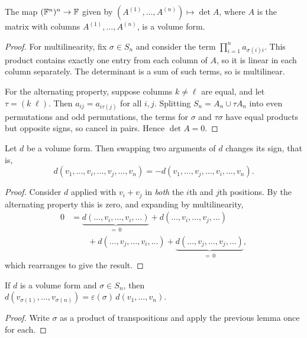 \documentclass[a4paper]{scrartcl}
\begin{document}
\begin{lemma}
    The map $(\mathbb{F}^n)^n \rightarrow \mathbb{F}$ given by $(A^{(1)}, \dots, A^{(n)}) \mapsto \det A$, where $A$ is the matrix with columns $A^{(1)}, \dots, A^{(n)}$, is a volume form.
\end{lemma}
\begin{proof}
    For multilinearity, fix $\sigma \in S_n$ and consider the term $\prod_{i = 1}^n a_{\sigma(i)i}$. This product contains exactly one entry from each column of $A$, so it is linear in each column separately. The determinant is a sum of such terms, so is multilinear.

    For the alternating property, suppose columns $k \neq \ell$ are equal, and let $\tau = (k\;\ell)$. Then $a_{i j} = a_{i \tau(j)}$ for all $i, j$. Splitting $S_n = A_n \cup \tau A_n$ into even permutations and odd permutations, the terms for $\sigma$ and $\tau\sigma$ have equal products but opposite signs, so cancel in pairs. Hence $\det A = 0$.
\end{proof}

\begin{lemma}
    Let $d$ be a volume form. Then swapping two arguments of $d$ changes its sign, that is,
    $$
    d(v_1, \dots, v_i, \dots, v_j, \dots, v_n) = -d(v_1, \dots, v_j, \dots, v_i, \dots, v_n).
    $$
\end{lemma}
\begin{proof}
    Consider $d$ applied with $v_i + v_j$ in \emph{both} the $i$th and $j$th positions. By the alternating property this is zero, and expanding by multilinearity,
    \begin{align*}
    0 &= \underbrace{d(\dots, v_i, \dots, v_i, \dots)}_{= \, 0} + d(\dots, v_i, \dots, v_j, \dots) \\
    &\qquad + d(\dots, v_j, \dots, v_i, \dots) + \underbrace{d(\dots, v_j, \dots, v_j, \dots)}_{=\, 0},
    \end{align*}
    which rearranges to give the result.
\end{proof}

\begin{corollary}
    If $d$ is a volume form and $\sigma \in S_n$, then $d(v_{\sigma(1)}, \dots, v_{\sigma(n)}) = \varepsilon(\sigma)\, d(v_1, \dots, v_n)$.
\end{corollary}
\begin{proof}
    Write $\sigma$ as a product of transpositions and apply the previous lemma once for each.
\end{proof}
\end{document}
